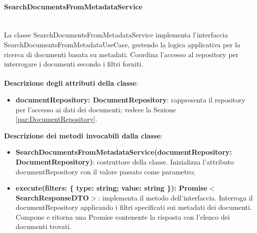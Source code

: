 \documentclass[a4paper,12pt]{article}
\begin{document}
{{                \paragraph{SearchDocumentsFromMetadataService}\label{par:SearchDocumentsFromMetadataService}\mbox{}\\
                La classe SearchDocumentsFromMetadataService implementa l'interfaccia SearchDocumentsFromMetadataUseCase, gestendo la logica applicativa per la ricerca di documenti basata su metadati. Coordina l'accesso al repository per interrogare i documenti secondo i filtri forniti.\\
                \\
                \textbf{Descrizione degli attributi della classe}:
                \begin{itemize}
                    \item \textbf{documentRepository: DocumentRepository}: rappresenta il repository per l'accesso ai dati dei documenti; vedere la Sezione \ref{par:DocumentRepository}.
                \end{itemize}
                
              \noindent \textbf{Descrizione dei metodi invocabili dalla classe}:
                \begin{itemize}
                    \item \textbf{SearchDocumentsFromMetadataService(documentRepository:\\DocumentRepository)}: costruttore della classe. Inizializza l'attributo documentRepository con il valore passato come parametro;
                    \item \textbf{execute(filters: \{ type: string; value: string \}): Promise$<$SearchResponseDTO$>$}: implementa il metodo dell'interfaccia. Interroga il documentRepository applicando i filtri specificati sui metadati dei documenti. Compone e ritorna una Promise contenente la risposta con l'elenco dei documenti trovati.
                \end{itemize}
}}
\end{document}
